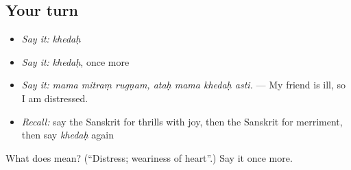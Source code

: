 \subsection*{Your turn}
\begin{itemize}
\raggedright
  \item \emph{Say it:} \emph{khedaḥ}
  \item \emph{Say it:} \emph{khedaḥ}, once more
  \item \emph{Say it:} \emph{mama mitraṃ rugṇam, ataḥ mama khedaḥ asti.} — My friend is ill, so I am distressed.
  \item \emph{Recall:} say the Sanskrit for thrills with joy, then the Sanskrit for merriment, then say \emph{khedaḥ} again
\end{itemize}

\begin{tcolorbox}[breakable,colback=teal!4,colframe=teal!35!black,title={Before you move on}]
What does  mean? (\textquotedblleft{}Distress; weariness of heart\textquotedblright{}.) Say it once more.
\end{tcolorbox}
